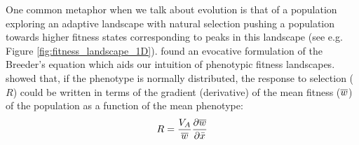 One common metaphor when we talk about evolution is that of a population exploring an adaptive landscape with natural selection pushing a population
towards higher fitness states corresponding to peaks in this landscape
(see e.g. Figure \ref{fig:fitness_landscape_1D}).  
\citet{lande1976natural} found an evocative formulation of the
Breeder's equation which aids our intuition of phenotypic fitness
landscapes. 
\citeauthor{lande1976natural} showed that,
if the phenotype is
normally distributed, the response to
selection ($R$) could be written in terms of the gradient (derivative) of the
mean fitness ($\overline{w}$) of the population
as a function of the mean phenotype:  
\begin{equation}
  R = \frac{V_A}{\wbar} \frac{\partial \wbar}{\partial \bar{x}}  \label{eqn:pheno_fitness_landscape}  %
\end{equation}


